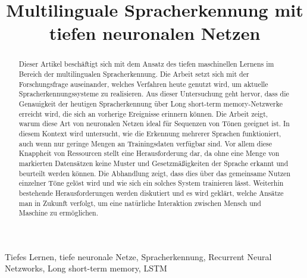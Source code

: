 \documentclass[conference]{IEEEtran}
\begin{document}
	
	\title{Multilinguale Spracherkennung mit tiefen neuronalen
	Netzen\\
	}
	
	\author{
		\and
		\and
	
	}
	
	\maketitle
	
	\begin{abstract}
	Dieser Artikel beschäftigt sich mit dem Ansatz des tiefen maschinellen Lernens im Bereich der multilingualen Spracherkennung.	Die Arbeit setzt sich mit der Forschungsfrage auseinander, welches Verfahren heute genutzt wird, um aktuelle Spracherkennungssysteme zu realisieren. Aus dieser Untersuchung geht hervor, dass die Genauigkeit der heutigen Spracherkennung über Long short-term memory-Netzwerke erreicht wird, die sich an vorherige Ereignisse erinnern können. Die Arbeit zeigt, warum diese Art von neuronalen Netzen ideal für Sequenzen von Tönen geeignet ist. In diesem Kontext wird untersucht, wie die Erkennung mehrerer Sprachen funktioniert, auch wenn nur geringe Mengen an Trainingsdaten verfügbar sind. Vor allem diese Knappheit von Ressourcen stellt eine Herausforderung dar, da ohne eine Menge von markierten Datensätzen keine Muster und Gesetzmäßigkeiten der Sprache erkannt und beurteilt werden können. Die Abhandlung zeigt, dass dies über das gemeinsame Nutzen einzelner Töne gelöst wird und wie sich ein solches System trainieren lässt. Weiterhin bestehende Herausforderungen werden diskutiert und es wird geklärt, welche Ansätze man in Zukunft verfolgt, um eine natürliche Interaktion zwischen Mensch und Maschine zu ermöglichen.
	\end{abstract}
	
	\begin{IEEEkeywords}
		Tiefes Lernen, tiefe neuronale Netze, Spracherkennung, Recurrent Neural Netzworks, Long short-term memory, LSTM 
	\end{IEEEkeywords}
	

	
	
	
	
	
	
	
	
	
	
	
\end{document}
